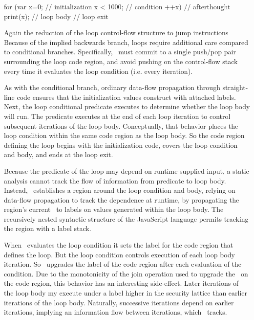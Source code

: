 \begin{jscode}
  for (var x=0;      // initialization
       x < 1000;     // condition
       ++x) {        // afterthought
    print(x);        // loop body
  }
  // loop exit
\end{jscode}

Again the reduction of the loop control-flow structure to jump instructions
Because of the implied backwards branch, loops require additional care compared to conditional branches.
Specifically, \FlowCore\ must commit to a single push/pop pair surrounding the loop code region, and avoid pushing on the control-flow stack every time it evaluates the loop condition (i.e. every iteration).

As with the conditional branch, ordinary data-flow propagation through straight-line code ensures that the initialization values construct with attached labels.
Next, the loop conditional predicate executes to determine whether the loop body will run.
The predicate executes at the end of each loop iteration to control subsequent iterations of the loop body.
Conceptually, that behavior places the loop condition within the same code region as the loop body.
So the code region defining the loop begins with the initialization code, covers the loop condition and body, and ends at the loop exit.

Because the predicate of the loop may depend on runtime-supplied input, a static analysis cannot track the flow of information from predicate to loop body.
Instead, \FlowCore\ establishes a region around the loop condition and body, relying on data-flow propagation to track the dependence at runtime, by propagating the region's current \pclabel\ to labels on values generated within the loop body.
The recursively nested syntactic structure of the JavaScript language permits tracking the region with a label stack.

When \FlowCore\ evaluates the loop condition it sets the label for the code region that defines the loop.
But the loop condition controls execution of each loop body iteration.
So \FlowCore\ upgrades the label of the code region after each evaluation of the condition.
Due to the monotonicity of the join operation used to upgrade the \pclabel\ on the code region, this behavior has an interesting side-effect.
Later iterations of the loop body my execute under a label higher in the security lattice than earlier iterations of the loop body.
Naturally, successive iterations depend on earlier iterations, implying an information flow between iterations, which \FlowCore\ tracks.

